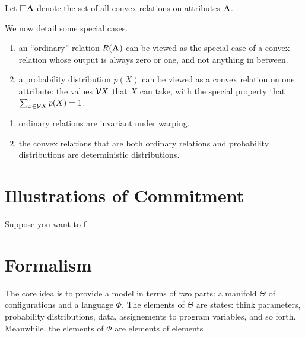 \documentclass{article}
\begin{document}
Let $\square \mathbf{A}$ denote the set of all convex relations on attributes $\mathbf{A}$. 

We now detail some special cases.
\begin{enumerate}
    \item an ``ordinary'' relation $R(\mathbf{A})$
        can be viewed as the special case of a convex relation whose output is always zero or one, and not anything in between.
    \item a probability distribution $p(X)$ can be viewed as a convex relation on one attribute: the values $\mathcal V X$ that $X$ can take, with the special property that 
    $\sum_{x \in \mathcal V X}p(X) = 1$.
\end{enumerate}

\begin{remark}
    \begin{enumerate}
        \item ordinary relations are invariant under warping. 
        \item the convex relations that are both ordinary relations and probability distributions are deterministic distributions.
    \end{enumerate}
\end{remark}

\begin{defn}
    
\end{defn}

\section{Illustrations of Commitment}

\begin{example}
    Suppose you want to f
\end{example}


\section{Formalism}
The core idea is to provide a model in terms of two parts: a manifold $\Theta$
of configurations and a language $\Phi$. 
The elements of $\Theta$ are states: think parameters, probability distributions, data, assignements to program variables, and so forth.
Meanwhile, the elements of $\Phi$ are elements of elements
\end{document}
